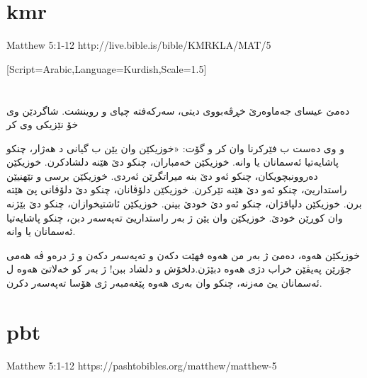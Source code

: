 \documentclass[12pt,fleqn,titlepage,twoside,a4paper]{book}
\begin{document}
\section{kmr}

Matthew 5:1-12 http://live.bible.is/bible/KMRKLA/MAT/5

\begin{arab}[utf]
[Script=Arabic,Language=Kurdish,Scale=1.5]

\section*{}

دەمێ عیسای جەماوەرێ خڕڤەبووی دیتی، سەركەفتە چیای و روینشت. شاگردێن وی خۆ نێزیكی وی كر

و وی دەست ب فێركرنا وان كر و گۆت:
«خوزیكێن وان یێن ب گیانی د هەژار،
چنكو پاشایەتیا ئەسمانان یا وانە.
خوزیكێن خەمباران،
چنكو دێ هێنە دلشادكرن.
خوزیكێن دەروونبچویكان،
چنكو ئەو دێ بنە میراتگرێن ئەردی.
خوزیكێن برسی و تێهنیێن راستداریێ،
چنكو ئەو دێ هێنە تێركرن.
خوزیكێن دلۆڤانان،
چنكو دێ دلۆڤانی پێ هێتە برن.
خوزیكێن دلپاقژان،
چنكو ئەو دێ خودێ بینن.
خوزیكێن ئاشتیخوازان،
چنكو دێ بێژنە وان كوڕێن خودێ.
خوزیكێن وان یێن ژ بەر راستداریێ تەپەسەر دبن،
چنكو پاشایەتیا ئەسمانان یا وانە.

خوزیكێن هەوە، دەمێ ژ بەر من هەوە فهێت دكەن و تەپەسەر دكەن و ژ درەو ڤە هەمی جۆرێن پەیڤێن خراب دژی هەوە دبێژن.دلخۆش و دلشاد ببن! ژ بەر كو خەلاتێ هەوە ل ئەسمانان یێ مەزنە، چنكو وان بەری هەوە پێغەمبەر ژی هۆسا تەپەسەر دكرن.

\end{arab}


\section{pbt}

Matthew 5:1-12 https://pashtobibles.org/matthew/matthew-5
\end{document}
